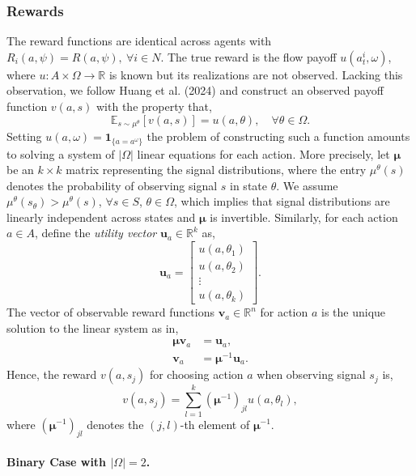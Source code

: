 \subsubsection*{Rewards}
The reward functions are identical across agents with $R_i(a, \psi)=R(a,\psi), \: \forall i \in N$. The true reward is the flow payoff $u(a^i_t, \omega)$, where $u: A \times \Omega \rightarrow \mathbb{R}$ is known but its realizations are not observed. Lacking this observation, we follow Huang et al. (2024) and construct an observed payoff function $v(a, s)$ with the property that, 
\[\mathbb{E}_{s \sim \mu^{\theta}}[v(a, s)] = u(a, \theta), \quad \forall \theta \in \Omega.\] Setting $u(a, \omega) = \mathbf{1}_{\{a=a^{\omega}\}}$ the problem of constructing such a function amounts to solving a system of $|\Omega|$ linear equations for each action.
More precisely, let $\bm{\mu}$ be an $k \times k$ matrix representing the signal distributions, where the entry $\mu^{\theta}(s)$ denotes the probability of observing signal $s$ in state $\theta$. We assume $\mu^{\theta}(s_{\theta}) > \mu^{\theta}(s)$, $\forall s \in S$, $\theta \in \Omega$, which implies that signal distributions are linearly independent across states and $\bm{\mu}$ is invertible. Similarly, for each action $a \in A$, define the \textit{utility vector} $\bm{u}_a \in \mathbb{R}^k$ as,
\begin{equation*}
    \bm{u}_a = \begin{bmatrix} u(a, \theta_1) \\ u(a, \theta_2) \\ \vdots \\ u(a, \theta_k) \end{bmatrix}.
\end{equation*}
The vector of observable reward functions $\bm{v}_a \in \mathbb{R}^n$ for action $a$ is the unique solution to the linear system as in,
\begin{align*}
    \bm{\mu} \bm{v}_a &= \bm{u}_a, \\
    \bm{v}_a &= \bm{\mu}^{-1} \bm{u}_a.
\end{align*}
Hence, the reward $v(a, s_j)$ for choosing action $a$ when observing signal $s_j$ is,
\begin{equation*}
    v(a, s_j) = \sum_{l=1}^k \left( \bm{\mu}^{-1} \right)_{jl} u(a, \theta_l),
\end{equation*}
where $\left( \bm{\mu}^{-1} \right)_{jl}$ denotes the $(j, l)$-th element of $\bm{\mu}^{-1}$.

\paragraph*{Binary Case with $|\Omega|=2$.}

